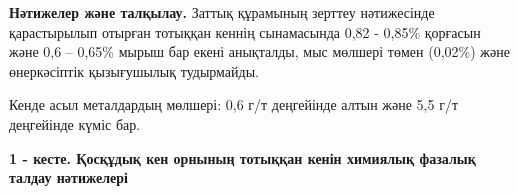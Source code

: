 {{\bfseries Нәтижелер және талқылау.} Заттық құрамының зерттеу нәтижесінде
қарастырылып отырған тотыққан кеннің сынамасында 0,82 - 0,85\% қорғасын
және 0,6 -- 0,65\% мырыш бар екені анықталды, мыс мөлшері төмен (0,02\%)
және өнеркәсіптік қызығушылық тудырмайды.

Кенде асыл металдардың мөлшері: 0,6 г/т деңгейінде алтын және 5,5 г/т
деңгейінде күміс бар.

{\bfseries 1 - кесте. Қосқұдық кен орнының тотыққан кенін химиялық фазалық
талдау нәтижелері}

}
